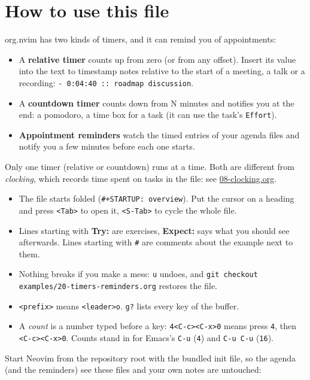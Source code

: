 \section{How to use this file}
\label{sec:orgd82a681}
org.nvim has two kinds of timers, and it can remind you of appointments:

\begin{itemize}
\item A \textbf{relative timer} counts up from zero (or from any offset). Insert its
value into the text to timestamp notes relative to the start of a
meeting, a talk or a recording: \texttt{- 0:04:40 :: roadmap discussion}.
\item A \textbf{countdown timer} counts down from N minutes and notifies you at the
end: a pomodoro, a time box for a task (it can use the task's \texttt{Effort}).
\item \textbf{Appointment reminders} watch the timed entries of your agenda files and
notify you a few minutes before each one starts.
\end{itemize}

Only one timer (relative or countdown) runs at a time. Both are different
from \emph{clocking}, which records time spent on tasks in the file: see
\href{08-clocking.org}{08-clocking.org}.

\begin{itemize}
\item The file starts folded (\texttt{\#+STARTUP: overview}). Put the cursor on a
heading and press \texttt{<Tab>} to open it, \texttt{<S-Tab>} to cycle the whole file.
\item Lines starting with \textbf{Try:} are exercises, \textbf{Expect:} says what you should
see afterwards. Lines starting with \texttt{\#} are comments about the example
next to them.
\item Nothing breaks if you make a mess: \texttt{u} undoes, and
\texttt{git checkout examples/20-timers-reminders.org} restores the file.
\item \texttt{<prefix>} means \texttt{<leader>o}. \texttt{g?} lists every key of the buffer.
\item A \emph{count} is a number typed before a key: \texttt{4<C-c><C-x>0} means press \texttt{4},
then \texttt{<C-c><C-x>0}. Counts stand in for Emacs's \texttt{C-u} (\texttt{4}) and
\texttt{C-u C-u} (\texttt{16}).
\end{itemize}

Start Neovim from the repository root with the bundled init file, so the
agenda (and the reminders) see these files and your own notes are
untouched:

